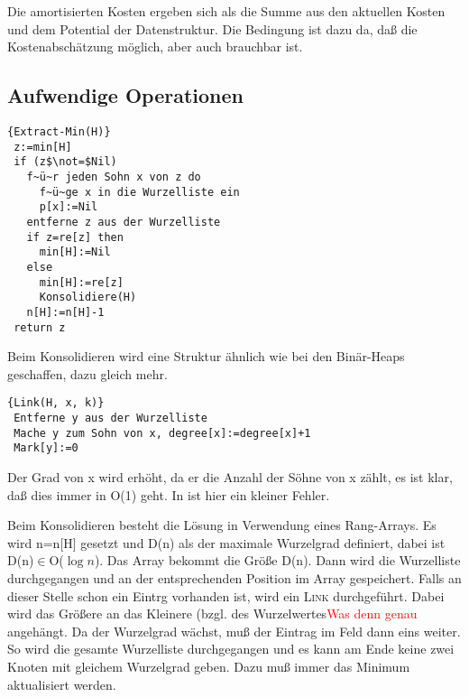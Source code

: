 \documentclass[ngerman,draft,parskip=half*,twoside]{scrreprt}
\theoremstyle{break}
\begin{document}
Die amortisierten Kosten ergeben sich als die Summe aus den aktuellen Kosten und dem Potential der Datenstruktur. Die
Bedingung ist dazu da, daß die Kostenabschätzung möglich, aber auch brauchbar ist.

\subsection{Aufwendige Operationen}
\begin{Algorithmus}[H]
\begin{lstlisting}[frame=tlrb, mathescape=true, title=\textsc{Extract-Min\textnormal{(H)}}, gobble=1]{Extract-Min(H)}
 z:=min[H]
 if (z$\not=$Nil)
   f~ü~r jeden Sohn x von z do
     f~ü~ge x in die Wurzelliste ein
     p[x]:=Nil
   entferne z aus der Wurzelliste
   if z=re[z] then
     min[H]:=Nil
   else
     min[H]:=re[z]
     Konsolidiere(H)
   n[H]:=n[H]-1
 return z   
\end{lstlisting}
Beim Konsolidieren wird eine Struktur ähnlich wie bei den Binär-Heaps geschaffen, dazu gleich mehr.
\end{Algorithmus}

\begin{Algorithmus}[H]
\begin{lstlisting}[frame=tlrb, mathescape=true, title=\textsc{Link\textnormal{(H, x, k)}}, gobble=1]{Link(H, x, k)}
 Entferne y aus der Wurzelliste
 Mache y zum Sohn von x, degree[x]:=degree[x]+1
 Mark[y]:=0
\end{lstlisting}
Der Grad von x wird erhöht, da er die Anzahl der Söhne von x zählt, es ist klar, daß dies immer in O(1) geht. In
\cite{ottmann} ist hier ein kleiner Fehler.
\end{Algorithmus}

Beim Konsolidieren besteht die Lösung in Verwendung eines Rang-Arrays.
Es wird n=n[H] gesetzt und D(n) als der maximale Wurzelgrad definiert, dabei ist D(n)$\in$O($\log n$). Das Array bekommt 
die Größe D(n). Dann wird die Wurzelliste durchgegangen und an der entsprechenden Position im Array gespeichert. Falls
an dieser Stelle schon ein Eintrg vorhanden ist, wird ein \textsc{Link} durchgeführt. Dabei wird das Größere an das
Kleinere (bzgl. des Wurzelwertes\textcolor{red}{Was denn genau} angehängt. Da der Wurzelgrad wächst, muß der Eintrag
im Feld dann eins weiter. So wird die gesamte Wurzelliste durchgegangen und es kann am Ende keine zwei Knoten mit
gleichem Wurzelgrad geben. Dazu muß immer das Minimum aktualisiert werden.
\end{document}
